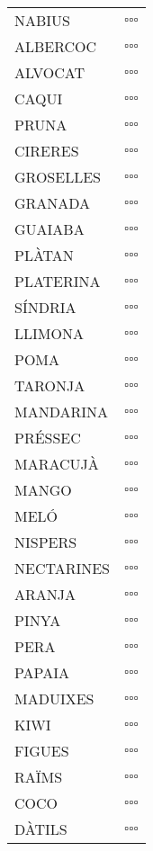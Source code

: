 \documentclass[landscape,a0paper,fontscale=0.285]{baposter} %
\begin{document}
\begin{poster}
{\begin{tabular}{p{}p{}}
NABIUS & $\square\square\square$ \\
ALBERCOC & $\square\square\square$ \\
ALVOCAT & $\square\square\square$ \\
CAQUI & $\square\square\square$ \\
PRUNA & $\square\square\square$ \\
CIRERES & $\square\square\square$ \\
GROSELLES & $\square\square\square$ \\
GRANADA & $\square\square\square$ \\
GUAIABA & $\square\square\square$ \\
PLÀTAN & $\square\square\square$ \\
PLATERINA & $\square\square\square$ \\
SÍNDRIA & $\square\square\square$ \\
LLIMONA & $\square\square\square$ \\
POMA & $\square\square\square$ \\
TARONJA & $\square\square\square$ \\
MANDARINA & $\square\square\square$ \\
PRÉSSEC & $\square\square\square$ \\
MARACUJÀ & $\square\square\square$ \\
MANGO & $\square\square\square$ \\
MELÓ & $\square\square\square$ \\
NISPERS & $\square\square\square$ \\
NECTARINES & $\square\square\square$ \\
ARANJA & $\square\square\square$ \\
PINYA & $\square\square\square$ \\
PERA & $\square\square\square$ \\
PAPAIA & $\square\square\square$ \\
MADUIXES & $\square\square\square$ \\
KIWI & $\square\square\square$ \\
FIGUES & $\square\square\square$ \\
RAÏMS & $\square\square\square$ \\
COCO & $\square\square\square$ \\
DÀTILS & $\square\square\square$ \\
\end{tabular}

}
\end{poster}
\end{document}
